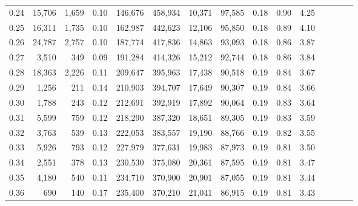 \begin{tabular}{rrrcrrrrrrrrrrr}
0.24 &  15,706 &  1,659 &                                       0.10 &  146,676 &  458,934 &   10,371 &   97,585 &  0.18 &  0.90 &                         4.25 \\
0.25 &  16,311 &  1,735 &                                       0.10 &  162,987 &  442,623 &   12,106 &   95,850 &  0.18 &  0.89 &                         4.10 \\
0.26 &  24,787 &  2,757 &                                       0.10 &  187,774 &  417,836 &   14,863 &   93,093 &  0.18 &  0.86 &                         3.87 \\
0.27 &   3,510 &    349 &                                       0.09 &  191,284 &  414,326 &   15,212 &   92,744 &  0.18 &  0.86 &                         3.84 \\
0.28 &  18,363 &  2,226 &                                       0.11 &  209,647 &  395,963 &   17,438 &   90,518 &  0.19 &  0.84 &                         3.67 \\
0.29 &   1,256 &    211 &                                       0.14 &  210,903 &  394,707 &   17,649 &   90,307 &  0.19 &  0.84 &                         3.66 \\
0.30 &   1,788 &    243 &                                       0.12 &  212,691 &  392,919 &   17,892 &   90,064 &  0.19 &  0.83 &                         3.64 \\
0.31 &   5,599 &    759 &                                       0.12 &  218,290 &  387,320 &   18,651 &   89,305 &  0.19 &  0.83 &                         3.59 \\
0.32 &   3,763 &    539 &                                       0.13 &  222,053 &  383,557 &   19,190 &   88,766 &  0.19 &  0.82 &                         3.55 \\
0.33 &   5,926 &    793 &                                       0.12 &  227,979 &  377,631 &   19,983 &   87,973 &  0.19 &  0.81 &                         3.50 \\
0.34 &   2,551 &    378 &                                       0.13 &  230,530 &  375,080 &   20,361 &   87,595 &  0.19 &  0.81 &                         3.47 \\
0.35 &   4,180 &    540 &                                       0.11 &  234,710 &  370,900 &   20,901 &   87,055 &  0.19 &  0.81 &                         3.44 \\
0.36 &     690 &    140 &                                       0.17 &  235,400 &  370,210 &   21,041 &   86,915 &  0.19 &  0.81 &                         3.43 \\

\end{tabular}
